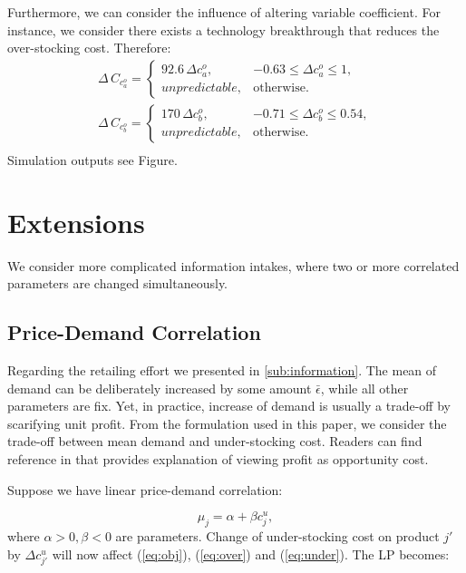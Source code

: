\documentclass[a4paper,11pt]{article}
\begin{document}
Furthermore, we can consider the influence of altering variable coefficient. For instance, we consider there exists a technology breakthrough that reduces the over-stocking cost. Therefore:
\[
\begin{aligned}
    \Delta \, C_{c_a^o} = 
    \begin{cases}
        92.6 \, \Delta c_a^o, & -0.63 \leq \Delta c_a^o \leq 1,\\
        unpredictable, & \text{otherwise}.
    \end{cases}\\
    \Delta \, C_{c_b^o} = 
    \begin{cases}
        170 \, \Delta c_b^o, & -0.71 \leq \Delta c_b^o \leq 0.54,\\
        unpredictable, & \text{otherwise}.
    \end{cases}\\
\end{aligned}
\]
Simulation outputs see Figure.

\section{Extensions}
\label{se:extensions}

We consider more complicated information intakes, where two or more correlated parameters are changed simultaneously.

\subsection{Price-Demand Correlation}
Regarding the retailing effort we presented in \ref{sub:information}. The mean of demand can be deliberately increased by some amount $\bar{\epsilon}$, while all other parameters are fix. Yet, in practice, increase of demand is usually a trade-off by scarifying unit profit. From the formulation used in this paper, we consider the trade-off between mean demand and under-stocking cost. Readers can find reference in \cite{Ch12,Po02,SPP98} that provides explanation of viewing profit as opportunity cost.

Suppose we have linear price-demand correlation:

\[
    \mu_j = \alpha + \beta c_j^u,
\]
where $\alpha > 0, \beta < 0$ are parameters. Change of under-stocking cost on product $j'$ by $\Delta c_{j'}^u$ will now affect (\ref{eq:obj}), (\ref{eq:over}) and (\ref{eq:under}). The LP becomes:
\end{document}
